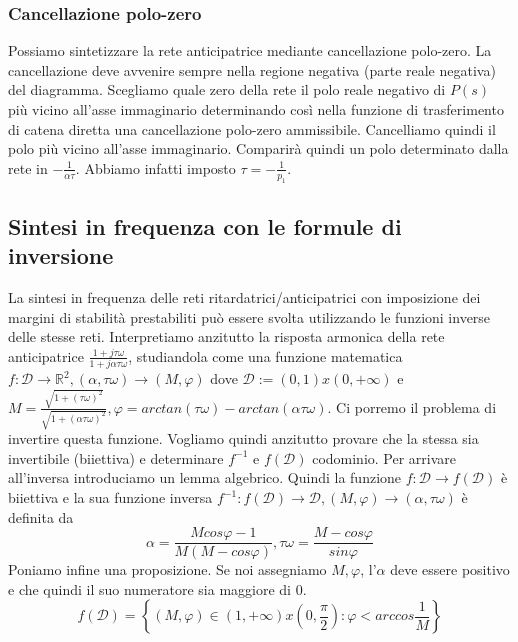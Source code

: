 \documentclass[11pt]{article}
\begin{document}
\subsubsection{Cancellazione polo-zero}
Possiamo sintetizzare la rete anticipatrice mediante cancellazione polo-zero. La cancellazione deve avvenire sempre nella regione negativa (parte reale negativa) del diagramma. Scegliamo quale zero della rete il polo reale negativo di $P(s)$ più vicino all'asse immaginario determinando così nella funzione di trasferimento di catena diretta una cancellazione polo-zero ammissibile. Cancelliamo quindi il polo più vicino all'asse immaginario. Comparirà quindi un polo determinato dalla rete in $-\frac{1}{\alpha\tau}$. Abbiamo infatti imposto $\tau=-\frac{1}{p_1}$.
\subsection{Sintesi in frequenza con le formule di inversione}
La sintesi in frequenza delle reti ritardatrici/anticipatrici con imposizione dei margini di stabilità prestabiliti può essere svolta utilizzando le funzioni inverse delle stesse reti. Interpretiamo anzitutto la risposta armonica della rete anticipatrice $\frac{1+j\tau\omega}{1+j\alpha\tau\omega}$, studiandola come una funzione matematica $f:\mathcal{D}\rightarrow \mathbb{R}^2, (\alpha,\tau\omega)\rightarrow(M,\varphi)$ dove $\mathcal{D}:=(0,1)x(0,+\infty)$ e $M=\frac{\sqrt{1+(\tau\omega)^2}}{\sqrt{1+(\alpha\tau\omega)^2}}, \varphi = arctan(\tau\omega)-arctan(\alpha\tau\omega)$. Ci porremo il problema di invertire questa funzione. Vogliamo quindi anzitutto provare che la stessa sia invertibile (biiettiva) e determinare $f^{-1}$ e $f(\mathcal{D})$ codominio. Per arrivare all'inversa introduciamo un lemma algebrico. Quindi la funzione $f:\mathcal{D}\rightarrow f(\mathcal{D})$ è biiettiva e la sua funzione inversa $f^{-1}:f(\mathcal{D})\rightarrow\mathcal{D}, (M,\varphi) \rightarrow (\alpha, \tau\omega)$ è definita da 
\begin{displaymath}
    \alpha=\frac{Mcos\varphi - 1}{M(M-cos\varphi)}, \tau\omega=\frac{M-cos\varphi}{sin\varphi}
\end{displaymath}
Poniamo infine una proposizione. Se noi assegniamo $M, \varphi$, l'$\alpha$ deve essere positivo e che quindi il suo numeratore sia maggiore di 0. 
\begin{displaymath}
    f(\mathcal{D}) = \left\{(M,\varphi) \in (1,+\infty)x\left(0,\frac{\pi}{2}\right):\varphi < arccos\frac{1}{M}\right\}
\end{displaymath}
\end{document}
